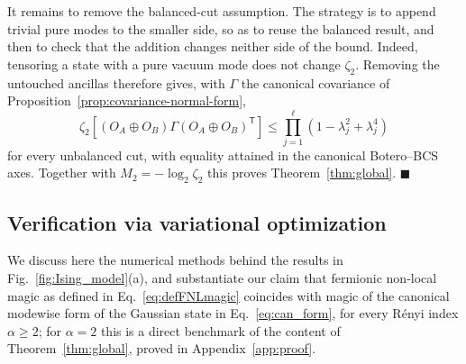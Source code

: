 \documentclass[prx,twocolumn,superscriptaddress,aps,10pt, frontmatterverbose, reprint,footinbib,longbibliography=true]{revtex4-2}
\newcommand{\trans}{\mathsf{T}}
\newcommand{\RENYI}{\alpha}
\begin{document}
It remains to remove the balanced-cut assumption. The strategy is to append trivial pure modes to the smaller side, so as to reuse the balanced result, and then to check that the addition changes neither side of the bound. Indeed, tensoring a state with a pure vacuum mode does not change $\zeta_2$. Removing the untouched ancillas therefore gives, with $\Gamma$ the canonical covariance of Proposition~\ref{prop:covariance-normal-form},
\begin{equation}
    \zeta_2\!\left[(O_A\oplus O_B)\Gamma(O_A\oplus O_B)^{\trans}\right]\le\prod_{j=1}^{\ell}\left(1-\lambda_j^2+\lambda_j^4\right)
\end{equation}
for every unbalanced cut, with equality attained in the canonical Botero--BCS axes. Together with $M_2=-\log_2\zeta_2$ this proves Theorem~\ref{thm:global}. \hfill$\blacksquare$

\subsection{Verification via variational optimization}
\label{app:variational}

We discuss here the numerical methods behind the results in Fig.~\ref{fig:Ising_model}(a), and substantiate our claim that fermionic non-local magic as defined in Eq.~\eqref{eq:defFNLmagic} coincides with magic of the canonical modewise form of the Gaussian state in Eq.~\eqref{eq:can_form}, for every R\'enyi index $\RENYI\ge2$; for $\RENYI=2$ this is a direct benchmark of the content of Theorem~\ref{thm:global}, proved in Appendix~\ref{app:proof}.
\end{document}

